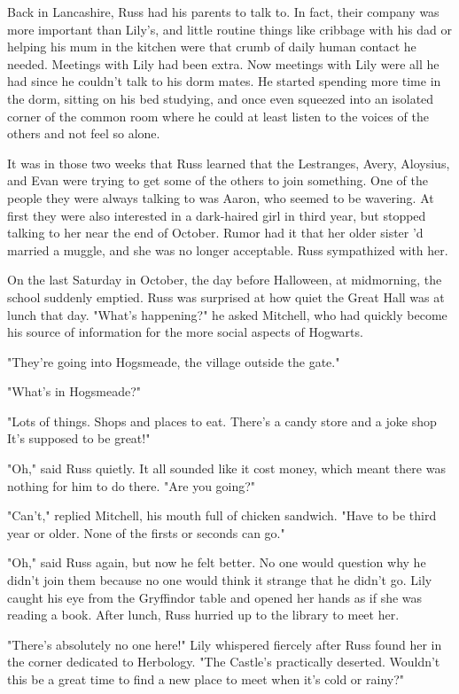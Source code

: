 Back in Lancashire, Russ had his parents to talk to. In fact, their company was more important than Lily's, and little routine things like cribbage with his dad or helping his mum in the kitchen were that crumb of daily human contact he needed. Meetings with Lily had been extra. Now meetings with Lily were all he had since he couldn't talk to his dorm mates. He started spending more time in the dorm, sitting on his bed studying, and once even squeezed into an isolated corner of the common room where he could at least listen to the voices of the others and not feel so alone.

It was in those two weeks that Russ learned that the Lestranges, Avery, Aloysius, and Evan were trying to get some of the others to join something. One of the people they were always talking to was Aaron, who seemed to be wavering. At first they were also interested in a dark-haired girl in third year, but stopped talking to her near the end of October. Rumor had it that her older sister 'd married a muggle, and she was no longer acceptable. Russ sympathized with her.

On the last Saturday in October, the day before Halloween, at midmorning, the school suddenly emptied. Russ was surprised at how quiet the Great Hall was at lunch that day. "What's{\el} happening?" he asked Mitchell, who had quickly become his source of information for the more social aspects of Hogwarts.

"They're going into Hogsmeade, the village outside the gate."

"What's in{\el} Hogsmeade?"

"Lots of things. Shops and places to eat. There's a candy store and a joke shop{\el} It's supposed to be great!"

"Oh," said Russ quietly. It all sounded like it cost money, which meant there was nothing for him to do there. "Are you{\el} going?"

"Can't," replied Mitchell, his mouth full of chicken sandwich. "Have to be third year or older. None of the firsts or seconds can go."

"Oh," said Russ again, but now he felt better. No one would question why he didn't join them because no one would think it strange that he didn't go. Lily caught his eye from the Gryffindor table and opened her hands as if she was reading a book. After lunch, Russ hurried up to the library to meet her.

"There's absolutely no one here!" Lily whispered fiercely after Russ found her in the corner dedicated to Herbology. "The Castle's practically deserted. Wouldn't this be a great time to find a new place to meet when it's cold or rainy?"

